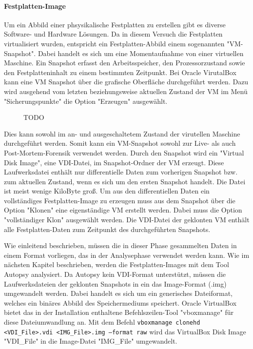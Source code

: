 \paragraph*{Festplatten-Image}
Um ein Abbild einer phsysikalische Festplatten zu erstellen gibt es diverse Software- und Hardware Lösungen. 
Da in diesem Versuch die Festplatten virtualisiert wurden, entspricht ein Festplatten-Abbild einem sogenannten "VM-Snapshot".
Dabei handelt es sich um eine Momentaufnahme von einer virtuellen Maschine. Ein Snapshot erfasst den Arbeitsspeicher, den Prozessorzustand sowie den Festplatteninhalt zu einem bestimmten Zeitpunkt. %
Bei Oracle VirutalBox kann eine VM Snapshot über die grafische Oberfläche durchgeführt werden.
Dazu wird ausgehend vom letzten beziehungsweise aktuellen Zustand der VM im Menü "Sicherungspunkte" die Option "Erzeugen" ausgewählt.
\begin{figure}[h!]
	\caption{TODO}
\end{figure}
Dies kann sowohl im an- und ausgeschaltetem Zustand der virutellen Maschine durchgeführt werden. Somit kann ein VM-Snapshot sowohl zur Live- als auch Post-Mortem-Forensik verwendet werden.
Durch den Snapshot wird ein "Virtual Disk Image", eine VDI-Datei, im Snapshot-Ordner der VM erzeugt. Diese Laufwerksdatei enthält nur differentielle Daten zum vorherigen Snapshot bzw. zum aktuellen Zustand, wenn es sich um den ersten Snapshot handelt. Die Datei ist meist wenige KiloByte groß.
Um aus den differentiellen Daten ein vollständiges Festplatten-Image zu erzeugen muss aus dem Snapshot über die Option "Klonen" eine eigenständige VM erstellt werden. 
Dabei muss die Option "vollständiger Klon" ausgewählt werden. Die VDI-Datei der geklonten VM enthält alle Festplatten-Daten zum Zeitpunkt des durchgeführten Snapshots.

Wie einleitend beschrieben, müssen die in dieser Phase gesammelten Daten in einem Format vorliegen, das in der Analysephase verwendet werden kann.
Wie im nächsten Kapitel beschrieben, werden die Festplatten-Images mit dem Tool Autopsy analysiert.
Da Autopsy kein VDI-Format unterstützt, müssen die Laufwerksdateien der geklonten Snapshots in ein das Image-Format (.img) umgewandelt werden.
Dabei handelt es sich um ein generisches Dateiformat, welches ein binäres Abbild des Speichermediums speichert. 
Oracle VirtualBox bietet das in der Installation enthaltene Befehlszeilen-Tool "vboxmanage" für diese Dateiumwandlung an. Mit dem Befehl \texttt{vboxmanage clonehd <VDI\_File>.vdi <IMG\_File>.img --format raw} wird das VirtualBox Disk Image "VDI\_File" in die Image-Datei "IMG\_File" umgewandelt.
			
